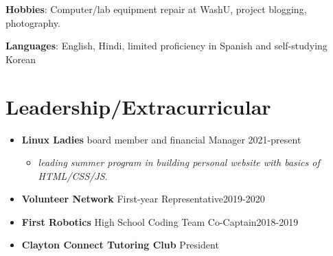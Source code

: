 \documentclass[12pt, letterpaper]{article}
\begin{document}
\noindent
\textbf{Hobbies}: Computer/lab equipment repair at WashU, project blogging, photography.
\vspace{0.2em}

\noindent
\textbf{Languages}: English, Hindi, limited proficiency in Spanish and self-studying Korean
\vspace{-1em}

\section*{\large{Leadership/Extracurricular}}\vspace{-0.5em}\hline\vspace{0.6em}

\begin{itemize}
    \item \textbf{Linux Ladies} board member and financial Manager \hfill 2021-present\vspace{-0.6em}
    \begin{itemize}
        \item \textit{leading summer program in building personal website with basics of HTML/CSS/JS}. \vspace{-0.6em}
    \end{itemize}
    \item \textbf{Volunteer Network} First-year Representative\hfill 2019-2020\vspace{-0.6em}
    \item \textbf{First Robotics} High School Coding Team Co-Captain\hfill 2018-2019\vspace{-0.6em}
    \item \textbf{Clayton Connect Tutoring Club} President \hfill \vspace{-0.6em}

    
\end{itemize}
\end{document}
